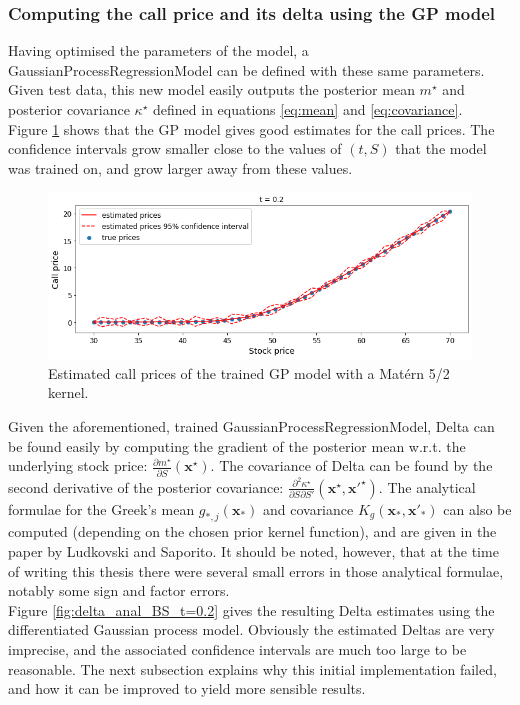 \documentclass[a4paper,12pt]{article}
\begin{document}
\subsubsection{Computing the call price and its delta using the GP model}
Having optimised the parameters of the model, a GaussianProcessRegressionModel can be defined with these same parameters. Given test data, this new model easily outputs the posterior mean $m^\star$ and posterior covariance $\kappa^\star$ defined in equations \ref{eq:mean} and \ref{eq:covariance}.\\
Figure \ref{fig:call_price_BS_t=0.2} shows that the GP model gives good estimates for the call prices. The confidence intervals grow smaller close to the values of $(t, S)$ that the model was trained on, and grow larger away from these values.
\begin{figure}[H]
    \centering
    \includegraphics[width = 0.9 \linewidth]{call_price_BS_t=0.2.png}
    \caption{Estimated call prices of the trained GP model with a Matérn 5/2 kernel.}
    \label{fig:call_price_BS_t=0.2}
\end{figure}
\noindent Given the aforementioned, trained GaussianProcessRegressionModel, Delta can be found easily by computing the gradient of the posterior mean w.r.t. the underlying stock price: $\frac{\partial m^\star}{\partial S}(\mathbf{x^\star})$. The covariance of Delta can be found by the second derivative of the posterior covariance: $\frac{\partial^2 \kappa^\star}{\partial S \partial S'}(\mathbf{x^\star}, \mathbf{x'^\star})$. The analytical formulae for the Greek's mean $g_{*,j}(\mathbf{x}_*)$ and covariance $K_g(\mathbf{x}_*,\mathbf{x}'_*)$ can also be computed (depending on the chosen prior kernel function), and are given in the paper by Ludkovski and Saporito. It should be noted, however, that at the time of writing this thesis there were several small errors in those analytical formulae, notably some sign and factor errors.\\
Figure \ref{fig:delta_anal_BS_t=0.2} gives the resulting Delta estimates using the differentiated Gaussian process model. Obviously the estimated Deltas are very imprecise, and the associated confidence intervals are much too large to be reasonable. The next subsection explains why this initial implementation failed, and how it can be improved to yield more sensible results.
\end{document}
